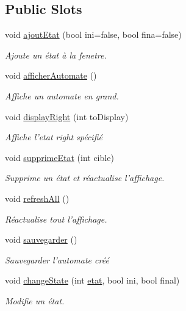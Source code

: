 \subsection*{Public Slots}
\begin{DoxyCompactItemize}
\item 
void \hyperlink{class_create_automate_aa0b73cfa67f2921a14d69c8d7345ae53}{ajout\-Etat} (bool ini=false, bool fina=false)
\begin{DoxyCompactList}\small\item\em Ajoute un état à la fenetre. \end{DoxyCompactList}\item 
\hypertarget{class_create_automate_a66a9d64abf7e1ad5e4ac7611491d32e5}{void \hyperlink{class_create_automate_a66a9d64abf7e1ad5e4ac7611491d32e5}{afficher\-Automate} ()}\label{class_create_automate_a66a9d64abf7e1ad5e4ac7611491d32e5}

\begin{DoxyCompactList}\small\item\em Affiche un automate en grand. \end{DoxyCompactList}\item 
void \hyperlink{class_create_automate_a5477eeb6bd6dd910d74aa4e7ee608a54}{display\-Right} (int to\-Display)
\begin{DoxyCompactList}\small\item\em Affiche l'etat right spécifié \end{DoxyCompactList}\item 
void \hyperlink{class_create_automate_aa9abcb9364d0fc6fd01193cc3cdec08c}{supprime\-Etat} (int cible)
\begin{DoxyCompactList}\small\item\em Supprime un état et réactualise l'affichage. \end{DoxyCompactList}\item 
\hypertarget{class_create_automate_afda9720982becab25e51355c0e1e5d89}{void \hyperlink{class_create_automate_afda9720982becab25e51355c0e1e5d89}{refresh\-All} ()}\label{class_create_automate_afda9720982becab25e51355c0e1e5d89}

\begin{DoxyCompactList}\small\item\em Réactualise tout l'affichage. \end{DoxyCompactList}\item 
\hypertarget{class_create_automate_a257c028c9d44547b9e3940b9260a1260}{void \hyperlink{class_create_automate_a257c028c9d44547b9e3940b9260a1260}{sauvegarder} ()}\label{class_create_automate_a257c028c9d44547b9e3940b9260a1260}

\begin{DoxyCompactList}\small\item\em Sauvegarder l'automate créé \end{DoxyCompactList}\item 
void \hyperlink{class_create_automate_a107306a68c03913c6d971c4fbd16efa5}{change\-State} (int \hyperlink{classetat}{etat}, bool ini, bool final)
\begin{DoxyCompactList}\small\item\em Modifie un état. \end{DoxyCompactList}\end{DoxyCompactItemize}
